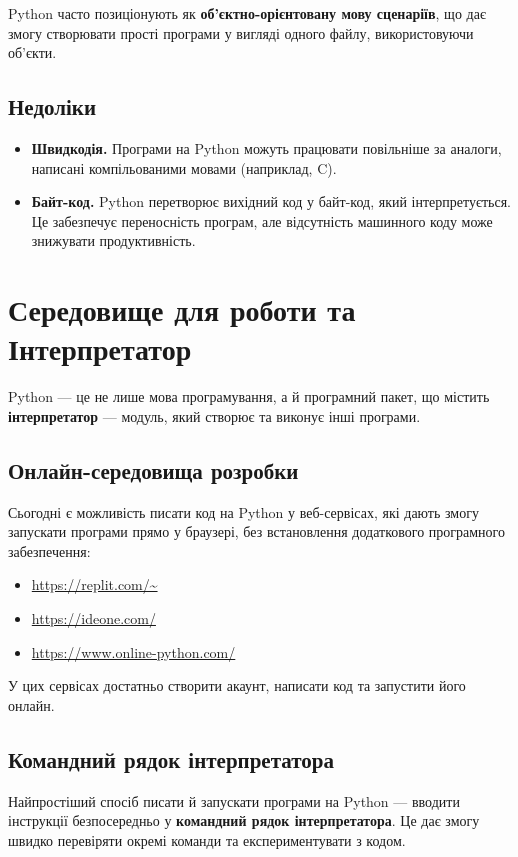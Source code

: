 Python часто позиціонують як \textbf{об’єктно-орієнтовану мову сценаріїв}, що дає змогу створювати прості програми у вигляді одного файлу, використовуючи об’єкти.

\subsection*{Недоліки}

\begin{itemize}
	\item \textbf{Швидкодія.} Програми на Python можуть працювати повільніше за аналоги, написані компільованими мовами (наприклад, C).
	\item \textbf{Байт-код.} Python перетворює вихідний код у байт-код, який інтерпретується. Це забезпечує переносність програм, але відсутність машинного коду може знижувати продуктивність.
\end{itemize}

\section{Середовище для роботи та Інтерпретатор}


Python --- це не лише мова програмування, а й програмний пакет, що містить \textbf{інтерпретатор} --- модуль, який створює та виконує інші програми.

\subsection*{Онлайн-середовища розробки}

Сьогодні є можливість писати код на Python у веб-сервісах, які дають змогу запускати програми прямо у браузері, без встановлення додаткового програмного забезпечення:
\begin{itemize}
	\item \url{https://replit.com/~}
	\item \url{https://ideone.com/}
	\item \url{https://www.online-python.com/}
\end{itemize}

\medskip
У цих сервісах достатньо створити акаунт, написати код та запустити його онлайн.

\subsection*{Командний рядок інтерпретатора}

Найпростіший спосіб писати й запускати програми на Python --- вводити інструкції безпосередньо у \textbf{командний рядок інтерпретатора}. Це дає змогу швидко перевіряти окремі команди та експериментувати з кодом.

